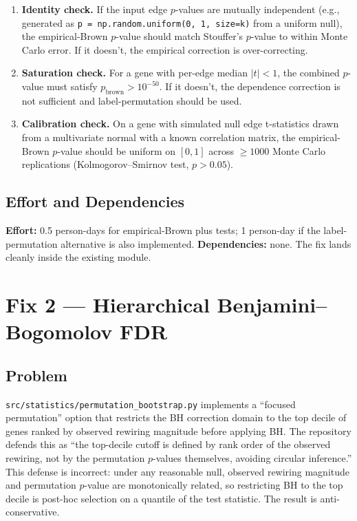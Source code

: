 \documentclass[11pt]{article}
\newcommand{\code}[1]{\texttt{#1}}
\begin{document}
\begin{enumerate}[leftmargin=*]
\item \textbf{Identity check.} If the input edge $p$-values are mutually independent (e.g., generated as \code{p = np.random.uniform(0, 1, size=k)} from a uniform null), the empirical-Brown $p$-value should match Stouffer's $p$-value to within Monte Carlo error. If it doesn't, the empirical correction is over-correcting.
\item \textbf{Saturation check.} For a gene with per-edge median $|t|<1$, the combined $p$-value must satisfy $p_{\text{brown}} > 10^{-50}$. If it doesn't, the dependence correction is not sufficient and label-permutation should be used.
\item \textbf{Calibration check.} On a gene with simulated null edge t-statistics drawn from a multivariate normal with a known correlation matrix, the empirical-Brown $p$-value should be uniform on $[0,1]$ across $\geq 1000$ Monte Carlo replications (Kolmogorov--Smirnov test, $p>0.05$).
\end{enumerate}

\subsection{Effort and Dependencies}

\textbf{Effort:} 0.5 person-days for empirical-Brown plus tests; 1 person-day if the label-permutation alternative is also implemented. \textbf{Dependencies:} none. The fix lands cleanly inside the existing module.

\section{Fix 2 --- Hierarchical Benjamini--Bogomolov FDR}

\subsection{Problem}

\code{src/statistics/permutation\_bootstrap.py} implements a ``focused permutation'' option that restricts the BH correction domain to the top decile of genes ranked by observed rewiring magnitude before applying BH. The repository defends this as ``the top-decile cutoff is defined by rank order of the observed rewiring, not by the permutation $p$-values themselves, avoiding circular inference.'' This defense is incorrect: under any reasonable null, observed rewiring magnitude and permutation $p$-value are monotonically related, so restricting BH to the top decile is post-hoc selection on a quantile of the test statistic. The result is anti-conservative.
\end{document}
